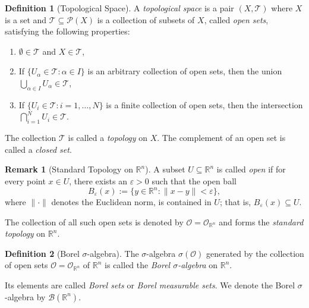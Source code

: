 \documentclass{article}
\theoremstyle{definition}
\newtheorem{definition}{Definition}[section]
\newtheorem{remark}{Remark}[section]
\begin{document}
\medskip
\begin{definition}[Topological Space]
A \textit{topological space} is a pair $(X, \mathcal{T})$ where $X$ is a set and $\mathcal{T} \subseteq \mathcal{P}(X)$ is a collection of subsets of $X$, called \textit{open sets}, satisfying the following properties:
\begin{enumerate}
    \item $\emptyset \in \mathcal{T}$ and $X \in \mathcal{T}$,
    \item If $\{U_\alpha \in \mathcal{T} : \alpha \in I\}$ is an arbitrary collection of open sets, then the union $\bigcup_{\alpha \in I} U_\alpha \in \mathcal{T}$,
    \item If $\{U_i \in \mathcal{T} : i = 1, \dots, N\}$ is a finite collection of open sets, then the intersection $\bigcap_{i=1}^N U_i \in \mathcal{T}$.
\end{enumerate}
The collection $\mathcal{T}$ is called a \textit{topology} on $X$. The complement of an open set is called a \textit{closed set}.
\end{definition}


\medskip
\begin{remark}[Standard Topology on \(\mathbb{R}^n\)]
A subset \( U \subseteq \mathbb{R}^n \) is called \textit{open} if for every point \( x \in U \), there exists an \(\varepsilon > 0\) such that the open ball
\[
B_\varepsilon(x) := \{ y \in \mathbb{R}^n : \|x - y\| < \varepsilon \},
\]
where \(\|\cdot\|\) denotes the Euclidean norm, is contained in \( U \); that is, \( B_\varepsilon(x) \subseteq U \).

The collection of all such open sets is denoted by \(\mathcal{O} = \mathcal{O}_{\mathbb{R}^n}\) and forms the \textit{standard topology} on \(\mathbb{R}^n\).
\end{remark}


\medskip
\begin{definition}[Borel $\sigma$-algebra]
The \(\sigma\)-algebra \(\sigma(\mathcal{O})\) generated by the collection of open sets \(\mathcal{O} = \mathcal{O}_{\mathbb{R}^n}\) of \(\mathbb{R}^n\) is called the \textit{Borel \(\sigma\)-algebra} on \(\mathbb{R}^n\). 

Its elements are called \textit{Borel sets} or \textit{Borel measurable sets}. We denote the Borel \(\sigma\)-algebra by \(\mathcal{B}(\mathbb{R}^n)\).
\end{definition}
\end{document}
